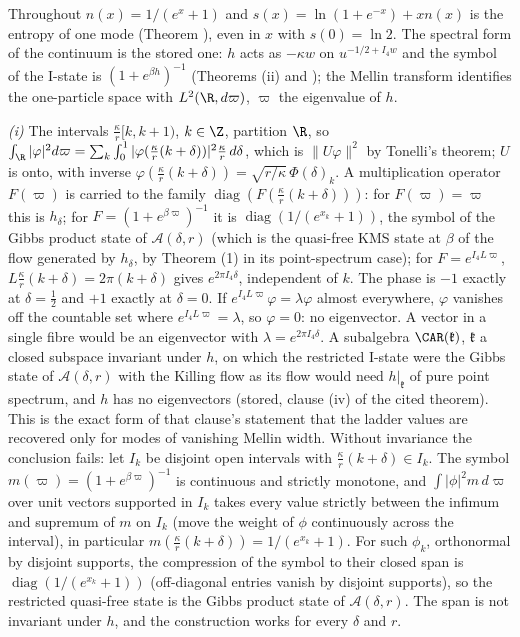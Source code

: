 Throughout $n(x) = 1/(e^{x} + 1)$ and $s(x) = \ln(1 + e^{-x}) + xn(x)$ is the entropy of one mode (Theorem ), even in $x$ with $s(0) = \ln 2$. The spectral form of the continuum is the stored one: $h$ acts as $-\kappa w$ on $u^{-1/2 + I_4w}$ and the symbol of the I-state is $(1 + e^{\beta h})^{-1}$ (Theorems (ii) and ); the Mellin transform identifies the one-particle space with $L^{2}(\R, d\varpi)$, $\varpi$ the eigenvalue of $h$.

\emph{(i)} The intervals $\tfrac{\kappa}{r}[k, k + 1)$, $k \in \Z$, partition $\R$, so $\int_{\R}|\varphi|^{2}d\varpi = \sum_{k}\int_{0}^{1}|\varphi(\tfrac{\kappa}{r}(k + \delta))|^{2}\tfrac{\kappa}{r}\,d\delta$, which is $\|U\varphi\|^{2}$ by Tonelli's theorem; $U$ is onto, with inverse $\varphi(\tfrac{\kappa}{r}(k + \delta)) = \sqrt{r/\kappa}\,\Phi(\delta)_{k}$. A multiplication operator $F(\varpi)$ is carried to the family $\operatorname{diag}(F(\tfrac{\kappa}{r}(k + \delta)))$: for $F(\varpi) = \varpi$ this is $h_{\delta}$; for $F = (1 + e^{\beta\varpi})^{-1}$ it is $\operatorname{diag}(1/(e^{x_{k}} + 1))$, the symbol of the Gibbs product state of $\mathcal{A}(\delta, r)$ (which is the quasi-free KMS state at $\beta$ of the flow generated by $h_{\delta}$, by Theorem (1) in its point-spectrum case); for $F = e^{I_4L\varpi}$, $L\tfrac{\kappa}{r}(k + \delta) = 2\pi(k + \delta)$ gives $e^{2\pi I_4\delta}$, independent of $k$. The phase is $-1$ exactly at $\delta = \tfrac12$ and $+1$ exactly at $\delta = 0$. If $e^{I_4L\varpi}\varphi = \lambda\varphi$ almost everywhere, $\varphi$ vanishes off the countable set where $e^{I_4L\varpi} = \lambda$, so $\varphi = 0$: no eigenvector. A vector in a single fibre would be an eigenvector with $\lambda = e^{2\pi I_4\delta}$. A subalgebra $\CAR(\mathfrak{k})$, $\mathfrak{k}$ a closed subspace invariant under $h$, on which the restricted I-state were the Gibbs state of $\mathcal{A}(\delta, r)$ with the Killing flow as its flow would need $h|_{\mathfrak{k}}$ of pure point spectrum, and $h$ has no eigenvectors (stored, clause (iv) of the cited theorem). This is the exact form of that clause's statement that the ladder values are recovered only for modes of vanishing Mellin width. Without invariance the conclusion fails: let $I_{k}$ be disjoint open intervals with $\tfrac{\kappa}{r}(k + \delta) \in I_{k}$. The symbol $m(\varpi) = (1 + e^{\beta\varpi})^{-1}$ is continuous and strictly monotone, and $\int|\phi|^{2}m\,d\varpi$ over unit vectors supported in $I_{k}$ takes every value strictly between the infimum and supremum of $m$ on $I_{k}$ (move the weight of $\phi$ continuously across the interval), in particular $m(\tfrac{\kappa}{r}(k + \delta)) = 1/(e^{x_{k}} + 1)$. For such $\phi_{k}$, orthonormal by disjoint supports, the compression of the symbol to their closed span is $\operatorname{diag}(1/(e^{x_{k}} + 1))$ (off-diagonal entries vanish by disjoint supports), so the restricted quasi-free state is the Gibbs product state of $\mathcal{A}(\delta, r)$. The span is not invariant under $h$, and the construction works for every $\delta$ and $r$.

